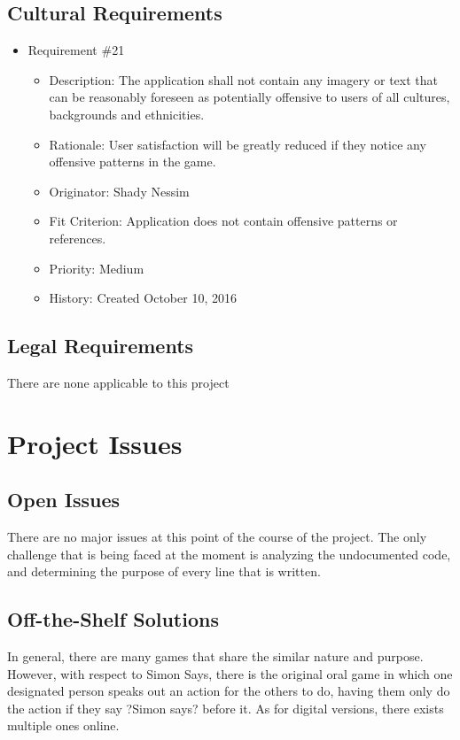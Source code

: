\documentclass[12pt, titlepage]{article}
\begin{document}
\subsection{Cultural Requirements}
\begin{itemize}

\item Requirement \#21
\begin{itemize} 
\item Description: The application shall not contain any imagery or text that can be reasonably foreseen as potentially oﬀensive to users of all cultures, backgrounds and ethnicities. 
\item Rationale: User satisfaction will be greatly reduced if they notice any offensive patterns in the game. 
\item Originator: Shady Nessim
\item Fit Criterion: Application does not contain offensive patterns or references. 
\item Priority: Medium 
\item History: Created October 10, 2016
\end{itemize}

\end{itemize}

\subsection{Legal Requirements}
There are none applicable to this project







\section{Project Issues}

\subsection{Open Issues}
There are no major issues at this point of the course of the project. The only challenge that is being faced at the moment is analyzing the undocumented code, and determining the purpose of every line that is written.

\subsection{Off-the-Shelf Solutions}
In general, there are many games that share the similar nature and purpose. However, with respect to Simon Says, there is the original oral game in which one designated person speaks out an action for the others to do, having them only do the action if they say ?Simon says? before it. As for digital versions, there exists multiple ones online.
\end{document}
